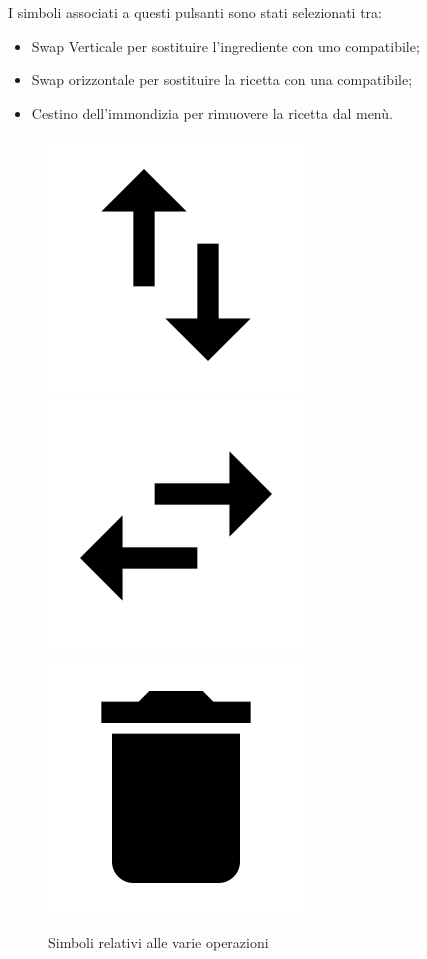 I simboli associati a questi pulsanti sono stati selezionati tra:
\begin{itemize}
	\item Swap Verticale per sostituire l'ingrediente con uno compatibile;
	\item Swap orizzontale per sostituire la ricetta con una compatibile;
	\item Cestino dell'immondizia per rimuovere la ricetta dal menù.
\end{itemize}
\begin{figure}[H]
	\centering
		\includegraphics[width=.12\textwidth]{img/icons/swapvert}
		\includegraphics[width=.12\textwidth]{img/icons/swaphor}
		\includegraphics[width=.12\textwidth]{img/icons/delete}
	\caption{Simboli relativi alle varie operazioni}
\end{figure}

